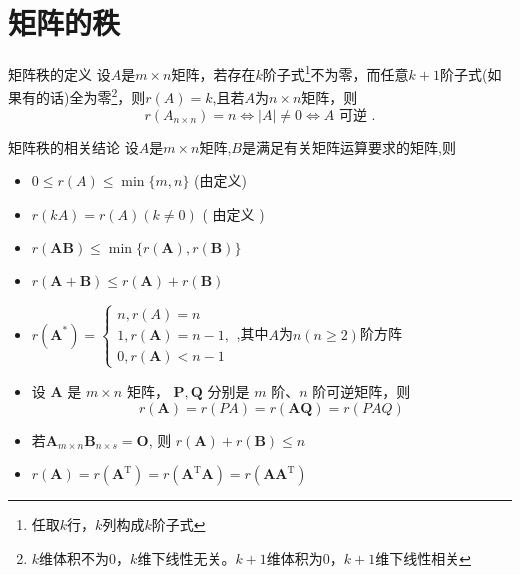\documentclass[8pt a4paper,oneside,UTF8]{ctexbook}
\begin{document}
\begin{sloppypar}
    \section{矩阵的秩}
    \begin{defn}{矩阵秩的定义}{}
        设$A$是$m\times n$矩阵，若存在$k$阶子式\footnote{任取$k$行，$k$列构成$k$阶子式}不为零，而任意$k+1$阶子式(如果有的话)全为零\footnote{$k$维体积不为0，$k$维下线性无关。$k+1$维体积为0，$k+1$维下线性相关}，则$r(A)=k$,且若$A$为$n\times n$矩阵，则
        $$
            r(A_{n\times n})=n\Leftrightarrow|A|\neq0\Leftrightarrow A\text{ 可逆 }.
        $$
    \end{defn}
    \begin{conclusion}{矩阵秩的相关结论}{}
        设$A$是$m\times n$矩阵,$B$是满足有关矩阵运算要求的矩阵,则
        \begin{itemize}
            \item $0 \leqslant r(A) \leqslant \min \{m, n\}$ (由定义)
            \item $r(k A)=r(A)(k \neq 0)$ ( 由定义 )
            \item $r(\boldsymbol{A} \boldsymbol{B}) \leqslant \min \{r(\boldsymbol{A}), r(\boldsymbol{B})\}$
            \item $r(\boldsymbol{A}+\boldsymbol{B}) \leqslant r(\boldsymbol{A})+r(\boldsymbol{B})$
            \item $r\left(\boldsymbol{A}^*\right)= \begin{cases}n,r(A)=n\\1,  r(\boldsymbol{A})=n-1, \\ 0,  r(\boldsymbol{A})<n-1\end{cases}$,其中$A$为$n(n≥2)$阶方阵
            \item 设 $\boldsymbol{A}$ 是 $m \times n$ 矩阵， $\boldsymbol{P}, \boldsymbol{Q}$ 分别是 $m$ 阶、$n$ 阶可逆矩阵，则
                  $$r(\boldsymbol{A})=r(PA )=r(\boldsymbol{A Q})=r(PAQ)$$
            \item 若$\boldsymbol{A}_{m \times n} \boldsymbol{B}_{n \times s}=\boldsymbol{O}$, 则 $r(\boldsymbol{A})+r(\boldsymbol{B}) \leqslant n$
            \item $r(\boldsymbol{A})=r\left(\boldsymbol{A}^{\mathrm{T}}\right)=r\left(\boldsymbol{A}^{\mathrm{T}} \boldsymbol{A}\right)=r\left(\boldsymbol{A} \boldsymbol{A}^{\mathrm{T}}\right)$
        \end{itemize}
    \end{conclusion}
    \ifx\allfiles\undefined
\end{sloppypar}
\end{document}

